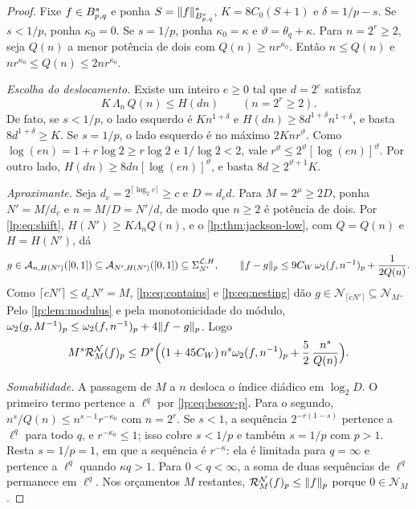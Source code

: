\documentclass[12pt,a4paper]{article}
\begin{document}
\begin{proof}
Fixe $f\in B^{s}_{p,q}$ e ponha $S=\|f\|^*_{B^{s}_{p,q}}$, $K=8C_0(S+1)$ e $\delta=1/p-s$. Se $s<1/p$, ponha $\kappa_0=0$. Se $s=1/p$, ponha $\kappa_0=\kappa$ e $\vartheta=\theta_q+\kappa$. Para $n=2^r\ge2$, seja $Q(n)$ a menor potência de dois com $Q(n)\ge nr^{\kappa_0}$. Então $n\le Q(n)$ e $nr^{\kappa_0}\le Q(n)\le2nr^{\kappa_0}$.

\emph{Escolha do deslocamento.} Existe um inteiro $e\ge0$ tal que $d=2^e$ satisfaz
\begin{equation}
 K\,\Lambda_n\,Q(n)\le H(dn)\qquad(n=2^r\ge2).
 \label{lp:eq:shift}
\end{equation}
De fato, se $s<1/p$, o lado esquerdo é $Kn^{1+\delta}$ e $H(dn)\ge8d^{1+\delta}n^{1+\delta}$, e basta $8d^{1+\delta}\ge K$. Se $s=1/p$, o lado esquerdo é no máximo $2Knr^{\vartheta}$. Como $\log(en)=1+r\log2\ge r\log2$ e $1/\log2<2$, vale $r^\vartheta\le2^\vartheta[\log(en)]^\vartheta$. Por outro lado, $H(dn)\ge8dn[\log(en)]^\vartheta$, e basta $8d\ge2^{\vartheta+1}K$.

\emph{Aproximante.} Seja $d_c=2^{\lceil\log_2c\rceil}\ge c$ e $D=d_cd$. Para $M=2^\mu\ge2D$, ponha $N'=M/d_c$ e $n=M/D=N'/d$, de modo que $n\ge2$ é potência de dois. Por \eqref{lp:eq:shift}, $H(N')\ge K\Lambda_nQ(n)$, e o \cref{lp:thm:jackson-low}, com $Q=Q(n)$ e $H=H(N')$, dá
\[
 g\in\mathcal A_{n,H(N')}([0,1])\subseteq\mathcal A_{N',H(N')}([0,1])\subseteq\Sigma_{N'}^{\mathcal L,H},
 \qquad
 \|f-g\|_p\le9C_W\,\omega_2(f,n^{-1})_{p}+\frac1{2Q(n)} .
\]
Como $\lceil cN'\rceil\le d_cN'=M$, \eqref{lp:eq:contains} e \eqref{lp:eq:nesting} dão $g\in\mathcal N_{\lceil cN'\rceil}\subseteq\mathcal N_M$. Pelo \cref{lp:lem:modulus} e pela monotonicidade do módulo, $\omega_2(g,M^{-1})_{p}\le\omega_2(f,n^{-1})_{p}+4\|f-g\|_p$. Logo
\[
 M^s\mathcal R^{\mathcal N}_{M}(f)_p
 \le D^s\Bigl((1+45C_W)\,n^s\omega_2(f,n^{-1})_{p}+\frac52\,\frac{n^s}{Q(n)}\Bigr).
\]

\emph{Somabilidade.} A passagem de $M$ a $n$ desloca o índice diádico em $\log_2D$. O primeiro termo pertence a $\ell^q$ por \eqref{lp:eq:besov-p}. Para o segundo, $n^s/Q(n)\le n^{s-1}r^{-\kappa_0}$ com $n=2^r$. Se $s<1$, a sequência $2^{-r(1-s)}$ pertence a $\ell^q$ para todo $q$, e $r^{-\kappa_0}\le1$; isso cobre $s<1/p$ e também $s=1/p$ com $p>1$. Resta $s=1/p=1$, em que a sequência é $r^{-\kappa}$: ela é limitada para $q=\infty$ e pertence a $\ell^q$ quando $\kappa q>1$. Para $0<q<\infty$, a soma de duas sequências de $\ell^q$ permanece em $\ell^q$. Nos orçamentos $M$ restantes, $\mathcal R^{\mathcal N}_{M}(f)_p\le\|f\|_p$ porque $0\in\mathcal N_M$.
\end{proof}
\end{document}
